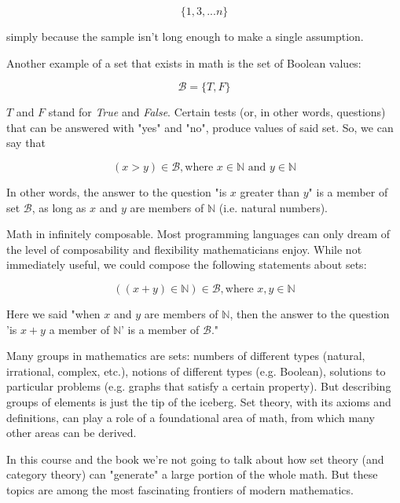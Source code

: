 \documentclass[a4paper, justified, notitlepage, sfsidenotes, notoc]{tufte-book}
\begin{document}
\begin{equation}
\{1, 3, ... n\}
\end{equation}

simply because the sample isn't long enough to make a single assumption.

Another example of a set that exists in math is the set of Boolean values:

\begin{equation}
\mathscr{B} = \{T, F\}
\end{equation}

\(T\) and \(F\) stand for \emph{True} and \emph{False}. Certain tests (or, in other words, questions) that can be answered with "yes" and "no", produce values of said set. So, we can say that

\begin{equation}
(x > y) \in \mathscr{B}, \textrm{where }  x \in \mathbb{N} \textrm{ and } y \in \mathbb{N}
\end{equation}

In other words, the answer to the question "is \(x\) greater than \(y\)" is a member of set \(\mathscr{B}\), as long as \(x\) and \(y\) are members of \(\mathbb{N}\) (i.e. natural numbers).

Math in infinitely composable. Most programming languages can only dream of the level of composability and flexibility mathematicians enjoy. While not immediately useful, we could compose the following statements about sets:

\begin{equation}
((x + y) \in \mathbb{N}) \in \mathscr{B}, \textrm{where }  x, y \in \mathbb{N}
\end{equation}

Here we said "when \(x\) and \(y\) are members of \(\mathbb{N}\), then the answer to the question 'is \(x + y\) a member of \(\mathbb{N}\)' is a member of \(\mathscr{B}\)."

Many groups in mathematics are sets: numbers of different types (natural, irrational, complex, etc.), notions of different types (e.g. Boolean), solutions to particular problems (e.g. graphs that satisfy a certain property). But describing groups of elements is just the tip of the iceberg. Set theory, with its axioms and definitions, can play a role of a foundational area of math, from which many other areas can be derived.

In this course and the book we're not going to talk about how set theory (and category theory) can "generate" a large portion of the whole math. But these topics are among the most fascinating frontiers of modern mathematics.
\end{document}
